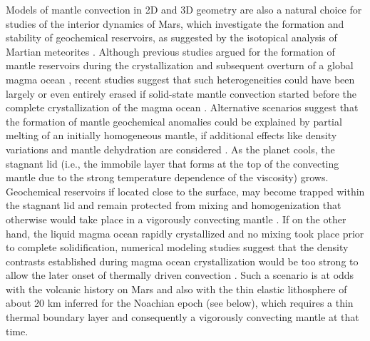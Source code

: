 Models of mantle convection in 2D and 3D geometry are also a natural choice for studies of the interior dynamics of Mars, which investigate the formation and stability of geochemical reservoirs, as suggested by the isotopical analysis of Martian meteorites \citep[e.g.,][]{Jagoutz1991}. Although previous studies argued for the formation of mantle reservoirs during the crystallization and subsequent overturn of a global magma ocean \citep[e.g.,][]{Elkins-Tanton2003, Elkins-Tanton2005}, recent studies suggest that such heterogeneities could have been largely or even entirely erased if solid-state mantle convection started before the complete crystallization of the magma ocean \citep{Maurice2017}. Alternative scenarios suggest that the formation of mantle geochemical anomalies could be explained by partial melting of an initially homogeneous mantle, if additional effects like density variations and mantle dehydration are considered \citep[e.g.,][]{Schott2001, Ogawa2011, Plesa2014a, Ruedas2017}. As the planet cools, the stagnant lid (i.e., the immobile layer that forms at the top of the convecting mantle due to the strong temperature dependence of the viscosity) grows. Geochemical reservoirs if located close to the surface, may become trapped within the stagnant lid and remain protected from mixing and homogenization that otherwise would take place in a vigorously convecting mantle \citep[e.g.,][]{Breuer2016}. If on the other hand, the liquid magma ocean rapidly crystallized and no mixing took place prior to complete solidification, numerical modeling studies suggest that the density contrasts established during magma ocean crystallization would be too strong to allow the later onset of thermally driven convection \citep{Tosi2013, Plesa2014}. Such a scenario is at odds with the volcanic history on Mars and also with the thin elastic lithosphere of about 20 km inferred for the Noachian epoch (see below), which requires a thin thermal boundary layer and consequently a vigorously convecting mantle at that time.

